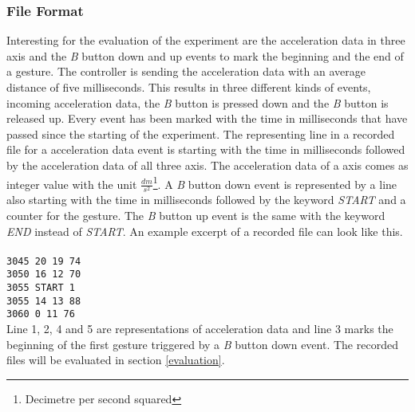 \subsubsection{File Format}
Interesting for the evaluation of the experiment are the acceleration data in three axis and the \textit{B} button down
and up events to mark the beginning and the end of a gesture. The controller is sending the acceleration data with an
average distance of five milliseconds. This results in three different kinds of events, incoming acceleration data, the
\textit{B} button is pressed down and the \textit{B} button is released up. Every event has been marked with the time in
milliseconds that have passed since the starting of the experiment. The representing line in a recorded file for a
acceleration data event is starting with the time in milliseconds followed by the acceleration data of all three axis.
The acceleration data of a axis comes as integer value with the unit
$\frac{dm}{s^2}$\footnote{Decimetre per second squared}. A \textit{B} button down event is represented by a line also
starting with the time in milliseconds followed by the keyword \textit{START} and a counter for the gesture. The
\textit{B} button up event is the same with the keyword \textit{END} instead of \textit{START}. An example excerpt of a
recorded file can look like this.\\\\
\verb!3045 20 19 74!\\
\verb!3050 16 12 70!\\
\verb!3055 START 1!\\
\verb!3055 14 13 88!\\
\verb!3060 0 11 76!\\

Line 1, 2, 4 and 5 are representations of acceleration data and line 3 marks the beginning of the first gesture
triggered by a \textit{B} button down event. The recorded files will be evaluated in section \ref{evaluation}.
